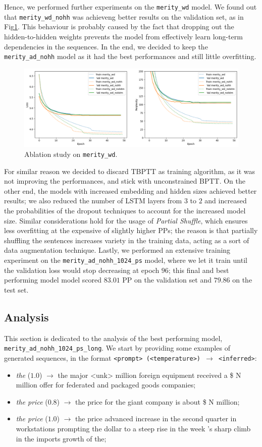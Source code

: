 Hence, we performed further experiments on the \texttt{merity\_wd} model. We found out that \texttt{merity\_wd\_nohh} was achieveng better results on the validation set, as in Fig\ref{fig:tl_merity_wd}. This behaviour is probably caused by the fact that dropping out the hidden-to-hidden weights prevents the model from effectively learn long-term dependencies in the sequences. In the end, we decided to keep the \texttt{merity\_ad\_nohh} model as it had the best performances and still little overfitting.
\begin{figure}
    \centering
    \includegraphics[width=.5\textwidth]{./assets/images/tl_merity_wd}
    \caption{Ablation study on \texttt{merity\_wd}.}
    \label{fig:tl_merity_wd}
\end{figure}

For similar reason we decided to discard TBPTT as training algorithm, as it was not improving the performances, and stick with unconstrained BPTT. On the other end, the models with increased embedding and hidden sizes achieved better results; we also reduced the number of LSTM layers from $3$ to $2$ and increased the probabilities of the dropout techniques to account for the increased model size. Similar considerations hold for the usage of \emph{Partial Shuffle}, which ensures less overfitting at the expensive of slightly higher PPs; the reason is that partially shuffling the sentences increases variety in the training data, acting as a sort of data augmentation technique. Lastly, we performed an extensive training experiment on the \texttt{merity\_ad\_nohh\_1024\_ps} model, where we let it train until the validation loss would stop decreasing at epoch $96$; this final and best performing model model scored $83.01$ PP on the validation set and $79.86$ on the test set.

\subsection{Analysis}
This section is dedicated to the analysis of the best performing model, \texttt{merity\_ad\_nohh\_1024\_ps\_long}. We start by providing some examples of generated sequences, in the format \texttt{<prompt> (<temperature>) $\rightarrow$ <inferred>}:
\begin{itemize}
    \item \emph{the} ($1.0$) $\rightarrow$ the major <unk> million foreign equipment received a \$ N million offer for federated and packaged goods companies;
    \item \emph{the price} ($0.8$) $\rightarrow$ the price for the giant company is about \$ N million;
    \item \emph{the price} ($1.0$) $\rightarrow$ the price advanced increase in the second quarter in workstations prompting the dollar to a steep rise in the week 's sharp climb in the imports growth of the;
\end{itemize}

